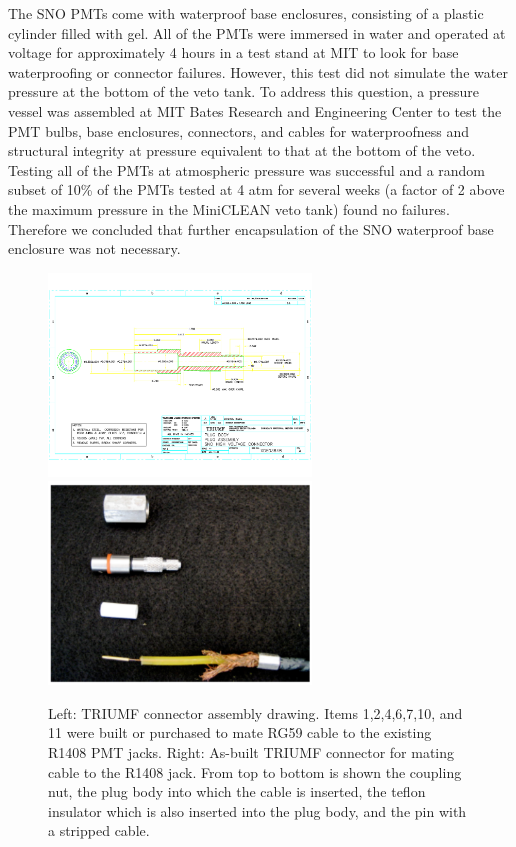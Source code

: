 \documentclass{JINST}
\begin{document}
The SNO PMTs come with waterproof base enclosures, consisting of a
plastic cylinder filled with gel. All of the PMTs were immersed in water and operated at voltage for approximately 4 hours in a test stand at
MIT to look for base waterproofing or connector failures. However,
this test did not simulate the water pressure at the bottom of the
veto tank. To address this question, a pressure vessel was assembled
at MIT Bates Research and Engineering Center to test the PMT bulbs, base enclosures, connectors, and
cables for waterproofness and structural integrity at pressure
equivalent to that at the bottom of the veto. Testing
all of the PMTs at atmospheric pressure was successful and a random
subset of 10\% of the PMTs tested at 4 atm for several weeks (a factor of 2
above the maximum pressure in the MiniCLEAN veto tank) found no
failures. Therefore we concluded that further encapsulation of the
SNO waterproof base enclosure was not necessary.

\begin{figure}[ht]
\begin{center}
\includegraphics[width=2.75in,page=13]{graphics/snoConnectorDrawings.pdf}
\includegraphics[width=2.75in]{graphics/connectorpic.pdf}
\caption{Left: TRIUMF connector assembly drawing. Items 1,2,4,6,7,10, and 11 were built or purchased to mate RG59 cable to the existing R1408 PMT jacks. Right: As-built TRIUMF connector for mating cable to the R1408 jack. From top to bottom is shown the coupling nut, the plug body into which the cable is inserted, the teflon insulator which is also inserted into the plug body, and the pin with a stripped cable.
\label{fig:connectordrawing}}
\end{center}
\end{figure}
\end{document}
